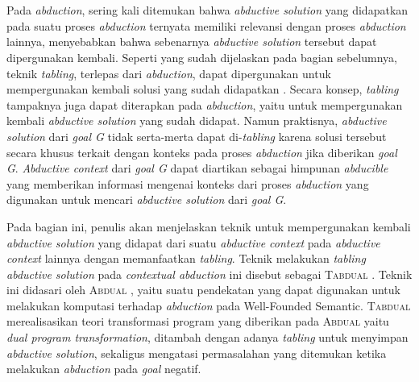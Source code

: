 \chapter{\babTiga}

\addtocounter{babTigaNum}{3}

\label{bab3}

Pada \textit{abduction}, sering kali ditemukan bahwa \textit{abductive solution} yang didapatkan pada suatu proses \textit{abduction} ternyata memiliki relevansi dengan proses \textit{abduction} lainnya, menyebabkan bahwa sebenarnya \textit{abductive solution} tersebut dapat dipergunakan kembali. Seperti yang sudah dijelaskan pada bagian sebelumnya, teknik \textit{tabling}, terlepas dari \textit{abduction}, dapat dipergunakan untuk mempergunakan kembali solusi yang sudah didapatkan \citep{swift1999tabling}. Secara konsep, \textit{tabling} tampaknya juga dapat diterapkan pada \textit{abduction}, yaitu untuk mempergunakan kembali \textit{abductive solution} yang sudah didapat. Namun praktisnya, \textit{abductive solution} dari \textit{goal G} tidak serta-merta dapat di-\textit{tabling} karena solusi tersebut secara khusus terkait dengan konteks pada proses \textit{abduction} jika diberikan \textit{goal G}. \textit{Abductive context} dari \textit{goal G} dapat diartikan sebagai himpunan \textit{abducible} yang memberikan informasi mengenai konteks dari proses \textit{abduction} yang digunakan untuk mencari \textit{abductive solution} dari \textit{goal G}.

Pada bagian ini, penulis akan menjelaskan teknik untuk mempergunakan kembali \textit{abductive solution} yang didapat dari suatu \textit{abductive context} pada \textit{abductive context} lainnya dengan memanfaatkan \textit{tabling}. Teknik melakukan \textit{tabling abductive solution} pada \textit{contextual abduction} ini disebut sebagai \textsc{Tabdual} \citep{saptawijaya2015tabdual}. Teknik ini didasari oleh \textsc{Abdual} \citep{alferes2004abduction}, yaitu suatu pendekatan yang dapat digunakan untuk melakukan komputasi terhadap \textit{abduction} pada Well-Founded Semantic. \textsc{Tabdual} merealisasikan teori transformasi program yang diberikan pada \textsc{Abdual} yaitu \textit{dual program transformation}, ditambah dengan adanya  \textit{tabling} untuk menyimpan \textit{abductive solution}, sekaligus mengatasi permasalahan yang ditemukan ketika melakukan \textit{abduction} pada \textit{goal} negatif. 

